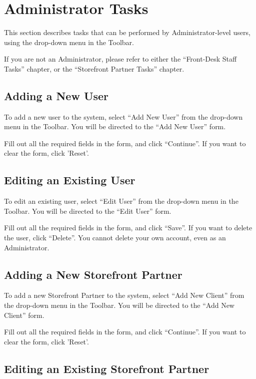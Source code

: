 \section{Administrator Tasks}

This section describes tasks that can be performed by Administrator-level users, using the drop-down menu in the Toolbar.

If you are not an Administrator, please refer to either the ``Front-Desk Staff Tasks'' chapter, or the ``Storefront Partner Tasks'' chapter.


\subsection{Adding a New User}

To add a new user to the system, select ``Add New User'' from the drop-down menu in the Toolbar. You will be directed to the ``Add New User'' form.

Fill out all the required fields in the form, and click ``Continue''. If you want to clear the form, click 'Reset'.


\subsection{Editing an Existing User}

To edit an existing user, select ``Edit User'' from the drop-down menu in the Toolbar. You will be directed to the ``Edit User'' form.

Fill out all the required fields in the form, and click ``Save''. If you want to delete the user, click ``Delete''. You cannot delete your own account, even as an Administrator.


\subsection{Adding a New Storefront Partner}

To add a new Storefront Partner to the system, select ``Add New Client'' from the drop-down menu in the Toolbar. You will be directed to the ``Add New Client'' form.

Fill out all the required fields in the form, and click ``Continue''. If you want to clear the form, click 'Reset'.


\subsection{Editing an Existing Storefront Partner}

